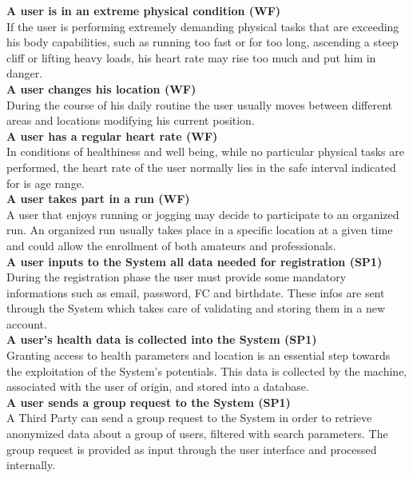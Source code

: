\documentclass[titlepage]{article}
\begin{document}
	{\bf A user is in an extreme physical condition (WF)}\\
	If the user is performing extremely demanding physical tasks that are exceeding his body capabilities, such as running too fast or for too long, ascending a steep cliff or lifting heavy loads, his heart rate may rise too much and put him in danger.\\ 

	{\bf A user changes his location (WF)} \\
	During the course of his daily routine the user usually moves between different areas and locations modifying his current position.\\ 

	{\bf A user has a regular heart rate (WF)} \\ 
	In conditions of healthiness and well being, while no particular physical tasks are performed, the heart rate of the user normally lies in the safe interval indicated for is age range.\\ 

	{\bf A user takes part in a run (WF)}\\
	A user that enjoys running or jogging may decide to participate to an organized run. An organized run usually takes place in a specific location at a given time and could allow the enrollment of both amateurs and professionals. \\ 

	{\bf A user inputs to the System all data needed for registration (SP1)} \\
	During the registration phase the user must provide some mandatory informations such as email, password, FC and birthdate. These infos are sent through the System which takes care of validating and storing them in a new account.\\ 

{\bf A user’s health data is collected into the System (SP1)} \\
Granting access to health parameters and location is an essential step towards the exploitation of the System’s potentials. This data is collected by the machine, associated with the user of origin, and stored into a database.\\

{\bf A user sends a group request to the System (SP1)} \\
A Third Party can send a group request to the System in order to retrieve anonymized data about a group of users, filtered with search parameters. The group request is provided as input through the user interface and processed internally.\\
\end{document}
